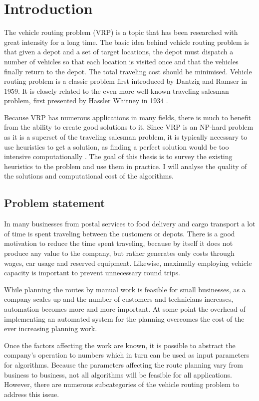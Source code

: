\chapter{Introduction}
\label{chapter:intro}

The vehicle routing problem (VRP) is a topic that has been researched with great intensity for a long time. The basic idea behind vehicle routing problem is that given a depot and a set of target locations, the depot must dispatch a number of vehicles so that each location is visited once and that the vehicles finally return to the depot. The total traveling cost should be minimised. Vehicle routing problem is a classic problem first introduced by Dantzig and Ramser in 1959. \cite{dantzig1959truck} It is closely related to the even more well-known traveling salesman problem, first presented by Hassler Whitney in 1934 \cite{flood1956traveling}. 

Because VRP has numerous applications in many fields, there is much to benefit from the ability to create good solutions to it. Since VRP is an NP-hard problem as it is a superset of the traveling salesman problem, it is typically necessary to use heuristics to get a solution, as finding a perfect solution would be too intensive computationally \cite{laporte2007you}. The goal of this thesis is to survey the existing heuristics to the problem and use them in practice. I will analyse the quality of the solutions and computational cost of the algorithms.

\section{Problem statement} 
In many businesses from postal services to food delivery and cargo transport a lot of time is spent traveling between the customers or depots. There is a good motivation to reduce the time spent traveling, because by itself it does not produce any value to the company, but rather generates only costs through wages, car usage and reserved equipment. Likewise, maximally employing vehicle capacity is important to prevent unnecessary round trips.  

While planning the routes by manual work is feasible for small businesses, as a company scales up and the number of customers and technicians increases, automation becomes more and more important. At some point the overhead of implementing an automated system for the planning overcomes the cost of the ever increasing planning work.

Once the factors affecting the work are known, it is possible to abstract the company's operation to numbers which in turn can be used as input parameters for algorithms. Because the parameters affecting the route planning vary from business to business, not all algorithms will be feasible for all applications. However, there are numerous subcategories of the vehicle routing problem to address this issue. 

